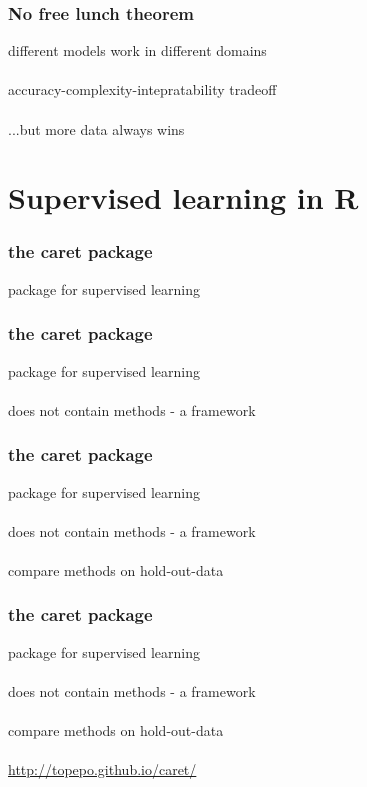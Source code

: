 \documentclass{beamer}
\begin{document}
\begin{frame}
	\frametitle{No free lunch theorem}
	\begin{center}
		different models work in different domains\\~\\
		accuracy-complexity-intepratability tradeoff\\~\\
		...but more data always wins
	\end{center}
\end{frame}

\section{Supervised learning in R}

\begin{frame}
	\frametitle{the caret package}
	\begin{center}
		package for supervised learning
	\end{center}
\end{frame}

\begin{frame}
	\frametitle{the caret package}
	\begin{center}
		package for supervised learning\\~\\
		does not contain methods - a framework
	\end{center}
\end{frame}

\begin{frame}
	\frametitle{the caret package}
	\begin{center}
		package for supervised learning\\~\\
		does not contain methods - a framework\\~\\
		compare methods on hold-out-data
	\end{center}
\end{frame}

\begin{frame}
	\frametitle{the caret package}
	\begin{center}
		package for supervised learning\\~\\
		does not contain methods - a framework\\~\\
		compare methods on hold-out-data\\~\\
		\href{http://topepo.github.io/caret/}{http://topepo.github.io/caret/}
	\end{center}
\end{frame}
\end{document}

